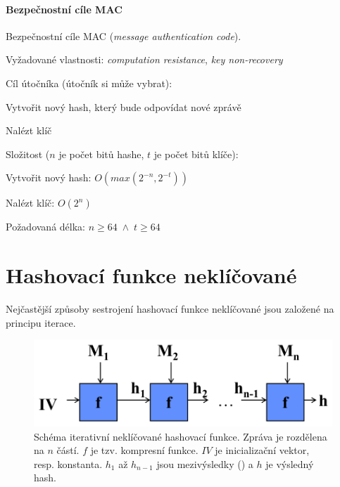 \paragraph*{Bezpečnostní cíle MAC} Bezpečnostní cíle MAC (\textit{message authentication code}). \begin{compactitem}
    \item Vyžadované vlastnosti: \textit{computation resistance}, \textit{key non-recovery}
    \item Cíl útočníka (útočník si může vybrat): \begin{compactitem}
        \item Vytvořit nový hash, který bude odpovídat nové zprávě
        \item Nalézt klíč
    \end{compactitem}
    \item Složitost ($n$ je počet bitů hashe, $t$ je počet bitů klíče): \begin{compactitem}
        \item Vytvořit nový hash: $O(max(2^{-n}, 2^{-t}))$
        \item Nalézt klíč: $O(2^n)$
    \end{compactitem}
    \item Požadovaná délka: $n \geq 64 \; \land \; t \geq 64$
\end{compactitem}


\section{Hashovací funkce neklíčované}

Nejčastější způsoby sestrojení hashovací funkce neklíčované jsou založené na principu iterace.

\begin{figure}[H]
    \centering
    \includegraphics[width=0.6\linewidth]{hash_function_iterative.pdf}
    \caption{Schéma iterativní neklíčované hashovací funkce. Zpráva je rozdělena na $n$ částí. $f$ je tzv. kompresní funkce. $IV$ je inicializační vektor, resp. konstanta. $h_1$ až $h_{n-1}$ jsou mezivýsledky () a $h$ je výsledný hash.}
\end{figure}

